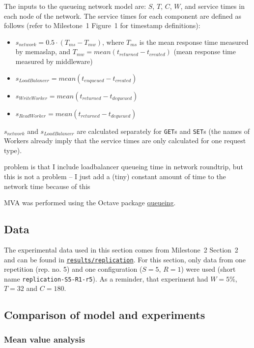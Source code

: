 \documentclass[11pt]{article}
\newcommand{\get}[0]{\texttt{GET}}
\newcommand{\set}[0]{\texttt{SET}}
\newcommand{\todo}[1]{\fcolorbox{black}{Apricot}{TODO: #1}}
\begin{document}
The inputs to the queueing network model are: $S$, $T$, $C$, $W$, and service times in each node of the network. The service times for each component are defined as follows (refer to Milestone~1 Figure~1 for timestamp definitions):

\begin{itemize}
	\item $s_{network} = 0.5 \cdot (T_{ms} - T_{mw})$, where $T_{ms}$ is the mean response time measured by memaslap, and $T_{mw} = mean(t_{returned}-t_{created})$ (mean response time measured by middleware)
	\item $s_{LoadBalancer} = mean(t_{enqueued}-t_{created})$
	\item $s_{WriteWorker} = mean(t_{returned}-t_{dequeued})$
	\item $s_{ReadWorker} = mean(t_{returned}-t_{dequeued})$
\end{itemize}

$s_{network}$ and $s_{LoadBalancer}$ are calculated separately for \get{}s and \set{}s (the names of Workers already imply that the service times are only calculated for one request type).

\todo{} problem is that I include loadbalancer queueing time in network roundtrip, but this is not a problem -- I just add a (tiny) constant amount of time to the network time because of this

MVA was performed using the Octave package \href{http://www.moreno.marzolla.name/software/queueing/queueing.html}{queueing}.


\subsection{Data}
\label{sec:part3:data}
The experimental data used in this section comes from Milestone~2 Section~2 and can be found in \texttt{\href{https://gitlab.inf.ethz.ch/pungast/asl-fall16-project/tree/master/results/replication}{results/replication}}. For this section, only data from one repetition (rep. no. 5) and one configuration ($S=5$, $R=1$) were used (short name \texttt{replication-S5-R1-r5}). As a reminder, that experiment had $W=5\%$, $T=32$ and $C=180$.

\subsection{Comparison of model and experiments}



\subsubsection{Mean value analysis}
\end{document}
